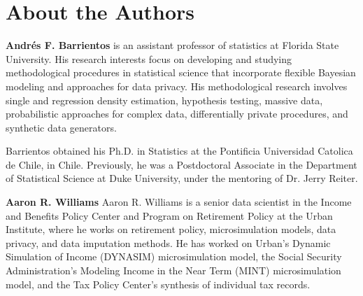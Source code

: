 \fancyfoot{}



\part{About the Authors}

\textbf{Andr\'es F. Barrientos} is an assistant professor of statistics at Florida State University. His research interests focus on developing and studying methodological procedures in statistical science that incorporate flexible Bayesian modeling and approaches for data privacy. His methodological research involves single and regression density estimation, hypothesis testing, massive data, probabilistic approaches for complex data, differentially private procedures, and synthetic data generators.

Barrientos obtained his Ph.D. in Statistics at the Pontificia Universidad Catolica de Chile, in Chile. Previously, he was a Postdoctoral Associate in the Department of Statistical Science at Duke University, under the mentoring of Dr. Jerry Reiter. 

\noindent\textbf{Aaron R. Williams} Aaron R. Williams is a senior data scientist in the Income and Benefits Policy Center and Program on Retirement Policy at the Urban Institute, where he works on retirement policy, microsimulation models, data privacy, and data imputation methods. He has worked on Urban’s Dynamic Simulation of Income (DYNASIM) microsimulation model, the Social Security Administration’s Modeling Income in the Near Term (MINT) microsimulation model, and the Tax Policy Center’s synthesis of individual tax records.

